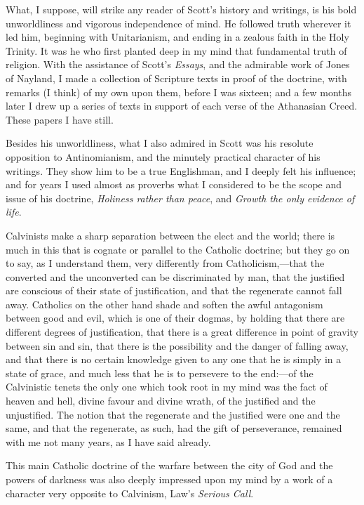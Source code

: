 What, I suppose, will strike any reader of Scott's history
and writings, is his bold unworldliness and vigorous independence of
mind. He followed truth wherever it led him, beginning with
Unitarianism, and ending in a zealous faith in the Holy Trinity. It
was he who first planted deep in my mind that fundamental truth of religion. With the assistance of Scott's
\emph{Essays}, and the
admirable work of Jones of Nayland, I made a collection of Scripture
texts in proof of the doctrine, with remarks (I think) of my own upon
them, before I was sixteen; and a few months later I drew up a series
of texts in support of each verse of the Athanasian Creed. These
papers I have still.

Besides his unworldliness, what I also admired in Scott was his
resolute opposition to Antinomianism, and the minutely practical
character of his writings. They show him to be a true Englishman, and
I deeply felt his influence; and for years I used almost as proverbs
what I considered to be the scope and issue of his doctrine, \emph{Holiness
rather than peace}, and \emph{Growth the only evidence of life}.

Calvinists make a sharp separation between the elect and the world;
there is much in this that is cognate or parallel to the Catholic doctrine; but they go on to say, as I
understand them, very differently from Catholicism,—that the
converted and the unconverted can be discriminated by man, that the
justified are conscious of their state of justification, and that the
regenerate cannot fall away. Catholics on the other hand shade and
soften the awful antagonism between good and evil, which is one of
their dogmas, by holding that there are different degrees of
justification, that there is a great difference in point of gravity
between sin and sin, that there is the possibility and the danger of
falling away, and that there is no certain knowledge given to any one
that he is simply in a state of grace, and much less that he is to
persevere to the end:—of the Calvinistic tenets the only one which
took root in my mind was the fact of heaven and hell, divine favour
and divine wrath, of the justified and the unjustified. The notion
that the regenerate and the justified were one and the same, and that
the regenerate, as such, had the gift of perseverance, remained
with me not many years, as I have said already.

This main Catholic doctrine of the warfare between the city of God
and the powers of darkness was also deeply impressed upon my mind by a
work of a character very opposite to Calvinism, Law's \emph{Serious Call}.

